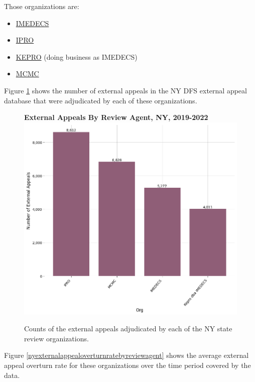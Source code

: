 \documentclass[12pt, a4paper,twoside]{report}
\theoremstyle{plain} %
\theoremstyle{definition} %
\theoremstyle{remark} %
\numberwithin{equation}{chapter}
\begin{document}
		Those organizations are:
		
		\begin{itemize}
			\item \href{https://www.imedecs.com/}{IMEDECS}
			\item \href{https://ipro.org/}{IPRO}
			\item \href{https://www.kepro.com/}{KEPRO} (doing business as IMEDECS)
			\item \href{https://www.mcmcllc.com/}{MCMC}
		\end{itemize}
	
		Figure \ref{nyexternalappealsbyreviewagent} shows the number of external appeals in the NY DFS external appeal database that were adjudicated by each of these organizations.
		
		\begin{figure}[h!]
			\centering
			\textbf{External Appeals By Review Agent, NY, 2019-2022}
			\includegraphics[width=.8\textwidth]{images/nys_external/external_appeals_by_agent.png}
			\caption{Counts of the external appeals adjudicated by each of the NY state review organizations.}
			\label{nyexternalappealsbyreviewagent}
		\end{figure}
	
		Figure \ref{nyexternalappealoverturnratebyreviewagent} shows the average external appeal overturn rate for these organizations over the time period covered by the data.
		
\end{document}
